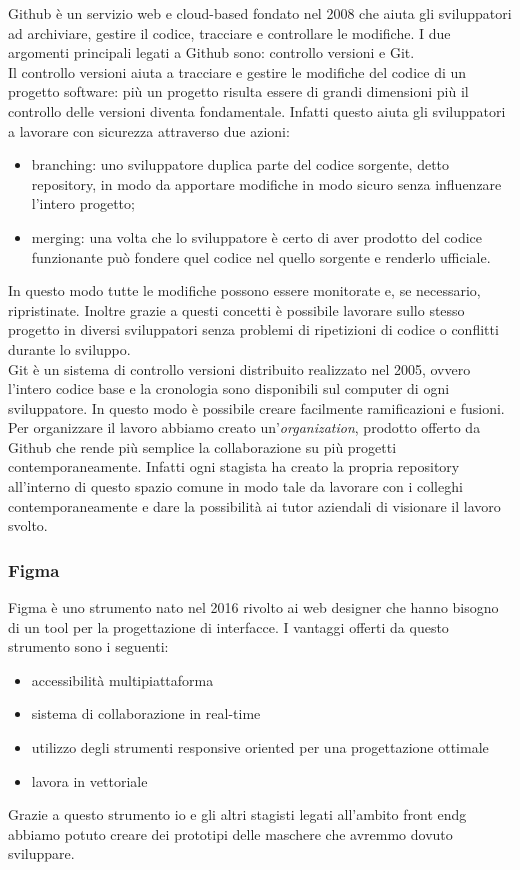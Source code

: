 Github è un servizio web e cloud-based fondato nel 2008 che aiuta gli sviluppatori ad archiviare, gestire il codice, tracciare e controllare le modifiche. I due argomenti principali legati a Github sono: controllo versioni e Git.\\
Il controllo versioni aiuta a tracciare e gestire le modifiche del codice di un progetto software: più un progetto risulta essere di grandi dimensioni più il controllo delle versioni diventa fondamentale. Infatti questo aiuta gli sviluppatori a lavorare con sicurezza attraverso due azioni:
\begin{itemize}
	\item branching: uno sviluppatore duplica parte del codice sorgente, detto repository, in modo da apportare modifiche in modo sicuro senza influenzare l'intero progetto;
	\item merging: una volta che lo sviluppatore è certo di aver prodotto del codice funzionante può fondere quel codice nel quello sorgente e renderlo ufficiale.
\end{itemize}
In questo modo tutte le modifiche possono essere monitorate e, se necessario, ripristinate. Inoltre grazie a questi concetti è possibile lavorare sullo stesso progetto in diversi sviluppatori senza problemi di ripetizioni di codice o conflitti durante lo sviluppo.\\
Git è un sistema di controllo versioni distribuito realizzato nel 2005, ovvero l'intero codice base e la cronologia sono disponibili sul computer di ogni sviluppatore. In questo modo è possibile creare facilmente ramificazioni e fusioni.\\
Per organizzare il lavoro abbiamo creato un'\textit{organization}, prodotto offerto da Github che rende più semplice la collaborazione su più progetti contemporaneamente. Infatti ogni stagista ha creato la propria repository all'interno di questo spazio comune in modo tale da lavorare con i colleghi contemporaneamente e dare la possibilità ai tutor aziendali di visionare il lavoro svolto.

\subsubsection{Figma}

Figma è uno strumento nato nel 2016 rivolto ai web designer che hanno bisogno di un tool per la progettazione di interfacce. I vantaggi offerti da questo strumento sono i seguenti:
\begin{itemize}
	\item accessibilità multipiattaforma
	\item sistema di collaborazione in real-time
	\item utilizzo degli strumenti responsive oriented per una progettazione ottimale
	\item lavora in vettoriale
\end{itemize}
Grazie a questo strumento io e gli altri stagisti legati all'ambito \gls{front endg} abbiamo potuto creare dei prototipi delle maschere che avremmo dovuto sviluppare.

